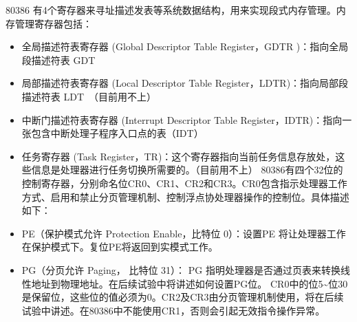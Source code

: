 80386
有4个寄存器来寻址描述发表等系统数据结构，用来实现段式内存管理。内存管理寄存器包括：

\begin{itemize}
\tightlist
\item
  全局描述符表寄存器 (Global Descriptor Table Register，GDTR
  )：指向全局段描述符表 GDT
\item
  局部描述符表寄存器 (Local Descriptor Table
  Register，LDTR)：指向局部段描述符表 LDT~（目前用不上）
\item
  中断门描述符表寄存器 (Interrupt Descriptor Table
  Register，IDTR)：指向一张包含中断处理子程序入口点的表（IDT）~
\item
  任务寄存器 (Task
  Register，TR)：这个寄存器指向当前任务信息存放处，这些信息是处理器进行任务切换所需要的。（目前用不上）
  80386有四个32位的控制寄存器，分别命名位CR0、CR1、CR2和CR3。CR0包含指示处理器工作方式、启用和禁止分页管理机制、控制浮点协处理器操作的控制位。具体描述如下：
\item
  PE（保护模式允许 Protection Enable，比特位 0）：设置PE
  将让处理器工作在保护模式下。复位PE将返回到实模式工作。
\item
  PG（分页允许 Paging， 比特位 31）： PG
  指明处理器是否通过页表来转换线性地址到物理地址。在后续试验中将讲述如何设置PG位。
  CR0中的位5\textasciitilde{}位30是保留位，这些位的值必须为0。CR2及CR3由分页管理机制使用，将在后续试验中讲述。在80386中不能使用CR1，否则会引起无效指令操作异常。
\end{itemize}
